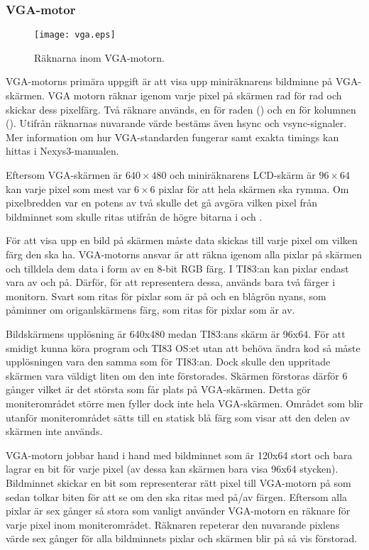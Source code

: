 \documentclass[main.tex]{subfiles}
\begin{document}
\subsubsection{VGA-motor}
\begin{SCfigure}
    \texttt{[image: vga.eps]}
    \label{fig:vga}
    \caption{Räknarna inom VGA-motorn.}
\end{SCfigure}
VGA-motorns primära uppgift är att visa upp miniräknarens bildminne på
VGA-skärmen. VGA motorn räknar igenom varje pixel på skärmen rad för rad och
skickar dess pixelfärg. Två räknare används, en för raden () och
en för kolumnen (). Utifrån räknarnas nuvarande värde bestäms även
hsync och vsync-signaler. Mer information om hur VGA-standarden fungerar samt
exakta timings kan hittas i Nexys3-manualen.\cite{nexys3}

Eftersom VGA-skärmen är $640\times480$ och miniräknarens LCD-skärm är
$96\times64$ kan varje pixel som mest var $6\times6$ pixlar för att hela
skärmen ska rymma. Om pixelbredden var en potens av två skulle det gå avgöra
vilken pixel från bildminnet som skulle ritas utifrån de högre bitarna i
 och .

För att visa upp en bild på skärmen måste data skickas till varje pixel om
vilken färg den ska ha. VGA-motorns ansvar är att räkna igenom alla pixlar på
skärmen och tilldela dem data i form av en 8-bit RGB färg. I TI83:an kan pixlar
endast vara av och på. Därför, för att representera dessa, används bara två
färger i monitorn. Svart som ritas för pixlar som är på och en blågrön nyans,
som påminner om origanlskärmens färg, som ritas för pixlar som är av.

Bildskärmens upplösning är 640x480 medan TI83:ans skärm är 96x64. För att
smidigt kunna köra program och TI83 OS:et utan att behöva ändra kod så måste
upplösningen vara den samma som för TI83:an. Dock skulle den uppritade skärmen
vara väldigt liten om den inte förstorades. Skärmen förstoras därför 6 gånger
vilket är det största som får plats på VGA-skärmen. Detta gör moniterområdet
större men fyller dock inte hela VGA-skärmen. Området som blir utanför
moniterområdet sätts till en statisk blå färg som visar att den delen av
skärmen inte används. 

VGA-motorn jobbar hand i hand med bildminnet som är 120x64 stort och bara
lagrar en bit för varje pixel (av dessa kan skärmen bara visa 96x64 stycken).
Bildminnet skickar en bit som representerar rätt pixel till VGA-motorn på som
sedan tolkar biten för att se om den ska ritas med på/av färgen. Eftersom alla
pixlar är sex gånger så stora som vanligt använder VGA-motorn en räknare för
varje pixel inom moniterområdet. Räknaren repeterar den nuvarande pixlens värde
sex gånger för alla bildminnets pixlar och skärmen blir på så vis förstorad.
\end{document}
